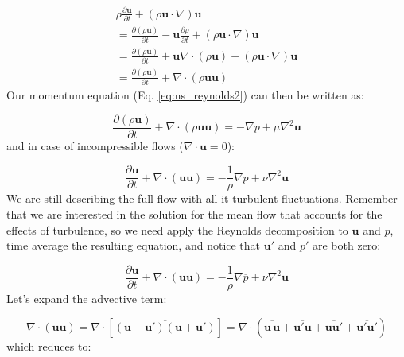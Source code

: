 \documentclass[12pt]{article}
\numberwithin{equation}{section}
\numberwithin{figure}{section}
\numberwithin{table}{section}
\begin{document}
\begin{equation}
\begin{split}
  \rho \frac{\partial \mathbf{u}}{\partial t} + (\rho \mathbf{u} \cdot \nabla) \mathbf{u} \\
  = \frac{\partial (\rho \mathbf{u})}{\partial t} - \mathbf{u} \frac{\partial \rho}{\partial t} + (\rho \mathbf{u} \cdot \nabla) \mathbf{u} \\
  = \frac{\partial (\rho \mathbf{u})}{\partial t} + \mathbf{u} \nabla \cdot (\rho \mathbf{u}) + (\rho \mathbf{u} \cdot \nabla) \mathbf{u} \\
  = \frac{\partial (\rho \mathbf{u})}{\partial t} + \nabla \cdot (\rho \mathbf{u} \mathbf{u})
\end{split}
\end{equation}
Our momentum equation (Eq. \ref{eq:ns_reynolds2}) can then be written as:

\begin{equation}
  \frac{\partial (\rho \mathbf{u})}{\partial t} +
  \nabla \cdot (\rho \mathbf{u} \mathbf{u}) =
  - \nabla p + \mu \nabla^2 \mathbf{u}
\end{equation}
and in case of incompressible flows ($\nabla \cdot \mathbf{u} = 0$):

\begin{equation}
  \frac{\partial \mathbf{u}}{\partial t} +
  \nabla \cdot (\mathbf{u} \mathbf{u}) =
  - \frac{1}{\rho} \nabla p + \nu \nabla^2 \mathbf{u}
  \label{eq:ns_reynolds3}
\end{equation}
We are still describing the full flow with all it turbulent fluctuations.
Remember that we are interested in the solution for the mean flow that accounts
for the effects of turbulence, so we need apply the Reynolds decomposition to
$\mathbf{u}$ and $p$, time average the resulting equation, and notice that
$\overline{\mathbf{u}'}$ and $\overline{p'}$ are both zero:

\begin{equation}
  \frac{\partial \overline{\mathbf{u}}}{\partial t} +
  \nabla \cdot (\overline{\mathbf{u}} \overline{\mathbf{u}}) =
  - \frac{1}{\rho} \nabla \overline{p} + \nu \nabla^2 \overline{\mathbf{u}}
\end{equation}
Let's expand the advective term:

\begin{equation}
   \nabla \cdot (\overline{\mathbf{u} {\mathbf{u}}}) =
   \nabla \cdot [\overline{(\overline{\mathbf{u}} + \mathbf{u}')(\overline{\mathbf{u}} + \mathbf{u}')}] =
   \nabla \cdot (\overline{\overline{\mathbf{u}}\, \overline{\mathbf{u}}} + \overline{\mathbf{u}' \overline{\mathbf{u}}} + \overline{\overline{\mathbf{u}} \mathbf{u}'} + \overline{\mathbf{u}' \mathbf{u}'})
\end{equation}
which reduces to:
\end{document}

